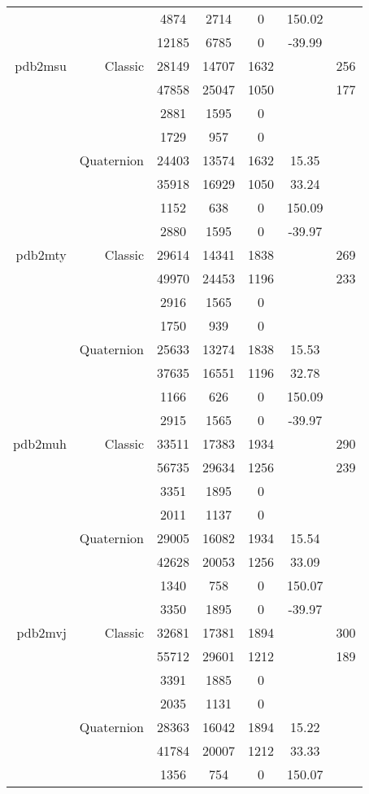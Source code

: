 \begin{xltabular}{\textwidth}{r|rcccSc}
& & 4874 & 2714 & 0 & 150.02 & \\
& & 12185 & 6785 & 0 & -39.99 & \\ \addlinespace
pdb2msu & Classic & 28149 & 14707 & 1632 & & 256 \\
& & 47858 & 25047 & 1050 & & 177 \\
& & 2881 & 1595 & 0 & & \\
& & 1729 & 957 & 0 & & \\
& Quaternion & 24403 & 13574 & 1632 & 15.35 & \\
& & 35918 & 16929 & 1050 & 33.24 & \\
& & 1152 & 638 & 0 & 150.09 & \\
& & 2880 & 1595 & 0 & -39.97 & \\ \addlinespace
pdb2mty & Classic & 29614 & 14341 & 1838 & & 269 \\
& & 49970 & 24453 & 1196 & & 233 \\
& & 2916 & 1565 & 0 & & \\
& & 1750 & 939 & 0 & & \\
& Quaternion & 25633 & 13274 & 1838 & 15.53 & \\
& & 37635 & 16551 & 1196 & 32.78 & \\
& & 1166 & 626 & 0 & 150.09 & \\
& & 2915 & 1565 & 0 & -39.97 & \\ \addlinespace
pdb2muh & Classic & 33511 & 17383 & 1934 & & 290 \\
& & 56735 & 29634 & 1256 & & 239 \\
& & 3351 & 1895 & 0 & & \\
& & 2011 & 1137 & 0 & & \\
& Quaternion & 29005 & 16082 & 1934 & 15.54 & \\
& & 42628 & 20053 & 1256 & 33.09 & \\
& & 1340 & 758 & 0 & 150.07 & \\
& & 3350 & 1895 & 0 & -39.97 & \\ \addlinespace
pdb2mvj & Classic & 32681 & 17381 & 1894 & & 300 \\
& & 55712 & 29601 & 1212 & & 189 \\
& & 3391 & 1885 & 0 & & \\
& & 2035 & 1131 & 0 & & \\
& Quaternion & 28363 & 16042 & 1894 & 15.22 & \\
& & 41784 & 20007 & 1212 & 33.33 & \\
& & 1356 & 754 & 0 & 150.07 & \\

\end{xltabular}
